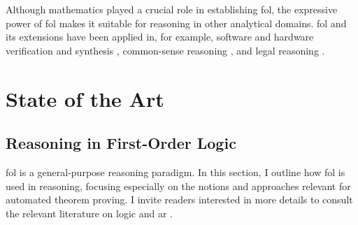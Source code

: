 Although mathematics played a crucial role in establishing \gls{fol},
the expressive power of \gls{fol} makes it suitable for reasoning in other analytical domains.
\Gls{fol} and its extensions have been applied in, for example, software and hardware verification and synthesis
\cite{
DBLP:journals/tcad/DSilvaKW08, %
DBLP:series/lncs/10001}, %
common-sense reasoning \cite{DBLP:conf/cade/PeaseS07}, and
legal reasoning \cite{DBLP:journals/logcom/PrakkenWBA15,
DBLP:conf/atal/LibalN21}.

\section{State of the Art}
\label{sec:sota}

\subsection{Reasoning in First-Order Logic}


\Gls{fol} is a general-purpose reasoning paradigm.
In this section, I outline how \gls{fol} is used in reasoning,
focusing especially on the notions and approaches relevant for automated theorem proving.
I invite readers interested in more details to consult the relevant literature on \gls{logic} \cite{DBLP:books/daglib/0072413,DBLP:books/daglib/0082098} and \gls{ar} \cite{DBLP:books/daglib/0022394,DBLP:books/el/RobinsonV01}.


